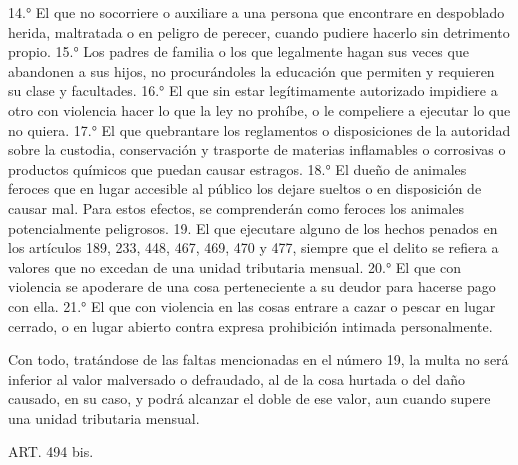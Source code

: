     14.° El que no socorriere o auxiliare a una persona que encontrare en despoblado herida, maltratada o en peligro de perecer, cuando pudiere hacerlo sin detrimento propio.
    15.° Los padres de familia o los que legalmente hagan sus veces que abandonen a sus hijos, no procurándoles la educación que permiten y requieren su clase y facultades.
    16.° El que sin estar legítimamente autorizado impidiere a otro con violencia hacer lo que la ley no prohíbe, o le compeliere a ejecutar lo que no quiera.
    17.° El que quebrantare los reglamentos o disposiciones de la autoridad sobre la custodia, conservación y trasporte de materias inflamables o corrosivas o productos químicos que puedan causar estragos.
    18.° El dueño de animales feroces que en lugar accesible al público los dejare sueltos o en disposición de causar mal.
    Para estos efectos, se comprenderán como feroces los animales potencialmente peligrosos.
    19.  El que ejecutare alguno de los hechos penados en los artículos 189, 233, 448, 467, 469, 470 y 477, siempre que el delito se refiera a valores que no excedan de una  unidad tributaria mensual.
    20.° El que con violencia se apoderare de una cosa perteneciente a su deudor para hacerse pago con ella.
    21.° El que con violencia en las cosas entrare a cazar o pescar en lugar cerrado, o en lugar abierto contra expresa prohibición intimada personalmente.

    Con todo, tratándose de las faltas mencionadas en el número 19, la multa no será inferior al valor malversado o defraudado, al de la cosa hurtada o del daño causado, en su caso, y podrá alcanzar el doble de ese valor, aun cuando supere una unidad tributaria mensual.






    ART. 494 bis.

